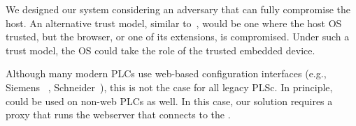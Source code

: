  We designed our system considering an adversary that can fully compromise the host. An alternative trust model, similar to~\cite{gyrus,nab}, would be one where the host OS trusted, but the browser, or one of its extensions, is compromised. Under such a trust model, the OS could take the role of the trusted embedded device. 


 Although many modern PLCs use web-based configuration interfaces (e.g., Siemens ~\cite{siemens,siemens2}, Schneider~\cite{schneider}), this is not the case for all legacy PLSc. In principle, \name could be used on non-web PLCs as well. In this case, our solution requires a proxy that runs the webserver that connects to the \device.

